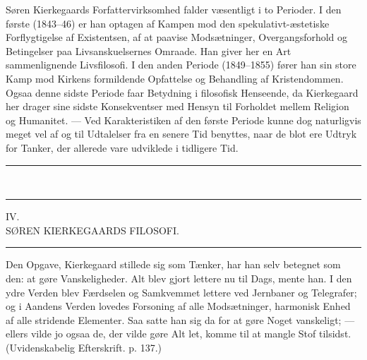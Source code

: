 \documentclass[12pt,a4paper,openany]{book}
\newcommand{\opage}[1]{\marginnote{\footnotesize\textit{[#1]}}}
\begin{document}
Søren Kierkegaards Forfattervirksomhed falder væsentligt
i to Perioder. I den første (1843--46) er han
optagen af Kampen mod den spekulativt-æstetiske Forflygtigelse
af Existentsen, af at paavise Modsætninger,
Overgangsforhold og Betingelser paa Livsanskuelsernes
Omraade. Han giver her en Art sammenlignende Livsfilosofi.
I den anden Periode (1849--1855) fører han sin
store Kamp mod Kirkens formildende Opfattelse og Behandling
af Kristendommen. Ogsaa denne sidste Periode
faar Betydning i filosofisk Henseende, da Kierkegaard
her drager sine sidste Konsekventser med Hensyn til
Forholdet mellem Religion og Humanitet. --- Ved Karakteristiken
af den første Periode kunne dog naturligvis
meget vel af og til Udtalelser fra en senere Tid benyttes,
naar de blot ere Udtryk for Tanker, der allerede vare
udviklede i tidligere Tid.
\begin{center}\rule{2cm}{0.4pt}\\[-8pt]\rule{2cm}{0.4pt}\end{center}

\opage{54}\begin{center}IV.\\[4pt] SØREN KIERKEGAARDS FILOSOFI.\\[4pt]\rule{1.5cm}{0.4pt}\end{center}

Den Opgave, Kierkegaard stillede sig som Tænker,
har han selv betegnet som den: at gøre Vanskeligheder.
Alt blev gjort lettere nu til Dags, mente han.
I den ydre Verden blev Færdselen og Samkvemmet lettere
ved Jernbaner og Telegrafer; og i Aandens Verden
lovedes Forsoning af alle Modsætninger, harmonisk Enhed
af alle stridende Elementer. Saa satte han sig da
for at gøre Noget vanskeligt; --- ellers vilde jo ogsaa
de, der vilde gøre Alt let, komme til at mangle Stof tilsidst.
(Uvidenskabelig Efterskrift. p. 137.)
\end{document}
